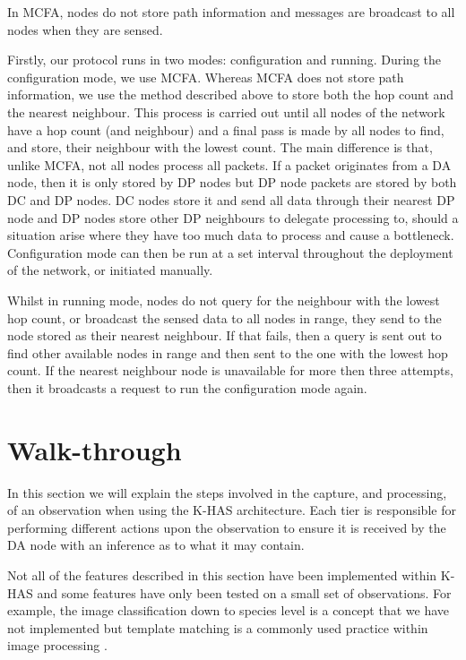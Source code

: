 		In MCFA, nodes do not store path information and messages are broadcast to all nodes when they are sensed.

		Firstly, our protocol runs in two modes: configuration and running. During the configuration mode, we use MCFA. Whereas MCFA does not store path information, we use the method described above to store both the hop count and the nearest neighbour. This process is carried out until all nodes of the network have a hop count (and neighbour) and a final pass is made by all nodes to find, and store, their neighbour with the lowest count. The main difference is that, unlike MCFA, not all nodes process all packets. If a packet originates from a DA node, then it is only stored by DP nodes but DP node packets are stored by both DC and DP nodes. DC nodes store it and send all data through their nearest DP node and DP nodes store other DP neighbours to delegate processing to, should a situation arise where they have too much data to process and cause a bottleneck. Configuration mode can then be run at a set interval throughout the deployment of the network, or initiated manually.

		Whilst in running mode, nodes do not query for the neighbour with the lowest hop count, or broadcast the sensed data to all nodes in range, they send to the node stored as their nearest neighbour. If that fails, then a query is sent out to find other available nodes in range and then sent to the one with the lowest hop count. If the nearest neighbour node is unavailable for more then three attempts, then it broadcasts a request to run the configuration mode again.

	
	\section{Walk-through}\label{arch:walk}
		In this section we will explain the steps involved in the capture, and processing, of an observation when using the K-HAS architecture. Each tier is responsible for performing different actions upon the observation to ensure it is received by the DA node with an inference as to what it may contain.
		
		Not all of the features described in this section have been implemented within K-HAS and some features have only been tested on a small set of observations. For example, the image classification down to species level is a concept that we have not implemented but template matching is a commonly used practice within image processing \cite{fast1995}.

